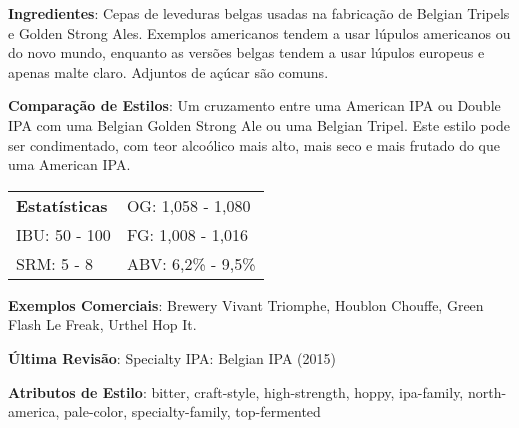 \textbf{Ingredientes}: Cepas de leveduras belgas usadas na fabricação de Belgian Tripels e Golden Strong Ales. Exemplos americanos tendem a usar lúpulos americanos ou do novo mundo, enquanto as versões belgas tendem a usar lúpulos europeus e apenas malte claro. Adjuntos de açúcar são comuns.

\textbf{Comparação de Estilos}: Um cruzamento entre uma American IPA ou Double IPA com uma Belgian Golden Strong Ale ou uma Belgian Tripel. Este estilo pode ser condimentado, com teor alcoólico mais alto, mais seco e mais frutado do que uma American IPA.

\begin{tabular}{@{}p{35mm}p{35mm}@{}}
  \textbf{Estatísticas} & OG: 1,058 - 1,080 \\
  IBU: 50 - 100 & FG: 1,008 - 1,016 \\
  SRM: 5 - 8  & ABV: 6,2\% - 9,5\%
\end{tabular}

\textbf{Exemplos Comerciais}: Brewery Vivant Triomphe, Houblon Chouffe, Green Flash Le Freak, Urthel Hop It.

\textbf{Última Revisão}: Specialty IPA: Belgian IPA (2015)

\textbf{Atributos de Estilo}: bitter, craft-style, high-strength, hoppy, ipa-family, north-america, pale-color, specialty-family, top-fermented
